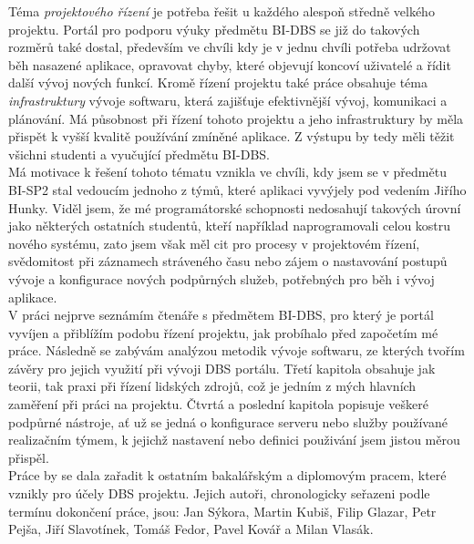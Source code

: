 Téma \emph{projektového řízení} je potřeba řešit u každého alespoň středně velkého projektu. Portál pro podporu výuky předmětu BI-DBS se již do takových rozměrů také dostal, především ve chvíli kdy je v jednu chvíli potřeba udržovat běh nasazené aplikace, opravovat chyby, které objevují koncoví uživatelé a řídit další vývoj nových funkcí. Kromě řízení projektu také práce obsahuje téma \emph{infrastruktury} vývoje softwaru, která zajišťuje efektivnější vývoj, komunikaci a plánování. Má působnost při řízení tohoto projektu a jeho infrastruktury by měla přispět k vyšší kvalitě používání zmíněné aplikace. Z výstupu by tedy měli těžit všichni studenti a vyučující předmětu BI-DBS.\\
Má motivace k řešení tohoto tématu vznikla ve chvíli, kdy jsem se v předmětu BI-SP2 stal vedoucím jednoho z týmů, které aplikaci vyvýjely pod vedením Jiřího Hunky. Viděl jsem, že mé programátorské schopnosti nedosahují takových úrovní jako některých ostatních studentů, kteří například naprogramovali celou kostru nového systému, zato jsem však měl cit pro procesy v projektovém řízení, svědomitost při záznamech stráveného času nebo zájem o nastavování postupů vývoje a konfigurace nových podpůrných služeb, potřebných pro běh i vývoj aplikace.\\
V práci nejprve seznámím čtenáře s předmětem BI-DBS, pro který je portál vyvíjen a přiblížím podobu řízení projektu, jak probíhalo před započetím mé práce. Následně se zabývám analýzou metodik vývoje softwaru, ze kterých tvořím závěry pro jejich využití při vývoji DBS portálu. Třetí kapitola obsahuje jak teorii, tak praxi při řízení lidských zdrojů, což je jedním z mých hlavních zaměření při práci na projektu. Čtvrtá a poslední kapitola popisuje veškeré podpůrné nástroje, ať už se jedná o konfigurace serveru nebo služby používané realizačním týmem, k jejichž nastavení nebo definici použivání jsem jistou měrou přispěl.\\
Práce by se dala zařadit k ostatním bakalářským a diplomovým pracem, které vznikly pro účely DBS projektu. Jejich autoři, chronologicky seřazeni podle termínu dokončení práce, jsou: Jan Sýkora, Martin Kubiš, Filip Glazar, Petr Pejša, Jiří Slavotínek, Tomáš Fedor, Pavel Kovář a Milan Vlasák.
